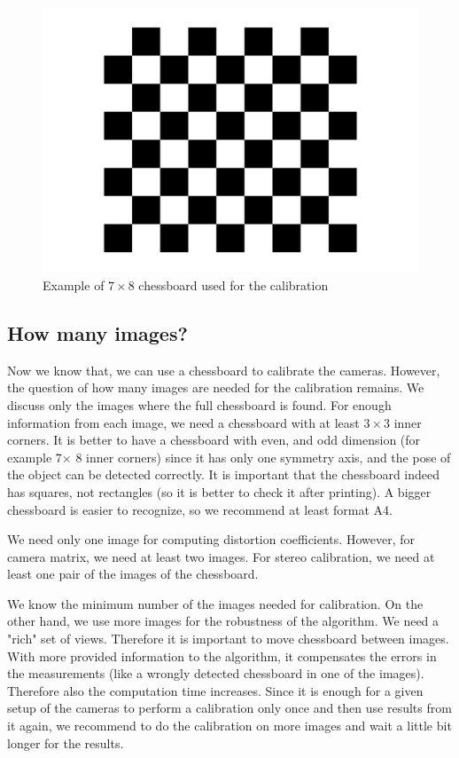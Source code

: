 \begin{figure}
	\centering
	\includegraphics[width=0.8\linewidth]{img/chessboard/7x8chessboard}
	\caption{Example of $7\times8$ chessboard used for the calibration}
	\label{fig:chessboard}
\end{figure}

\subsection{How many images?} 

Now we know that, we can use a chessboard to calibrate
the cameras. However, the question of how many images are needed for the
calibration remains. We discuss only the images where the full chessboard is
found. For enough information from each image, we need a chessboard with at
least $3\times3$ inner corners. It is better to have a chessboard with even,
and odd dimension (for example 7$\times$ 8 inner corners) since it has only one
symmetry axis, and the pose of the object can be detected correctly. It is
important that the chessboard indeed has squares, not rectangles (so it is better
to check it after printing). A bigger chessboard is easier to recognize, so we
recommend at least format A4.

We need only one image for computing distortion coefficients. However, for
camera matrix, we need at least two images. For stereo calibration, we need at
least one pair of the images of the chessboard.

We know the minimum number of the images needed for calibration. On the other
hand, we use more images for the robustness of the algorithm. We need a "rich"
set of views. Therefore it is important to move chessboard between images. With
more provided information to the algorithm, it compensates the errors in the
measurements (like a wrongly detected chessboard in one of the images).
Therefore also the computation time increases. Since it is enough for a given
setup of the cameras to perform a calibration only once and then use results
from it again, we recommend to do the calibration on more images and wait a
little bit longer for the results. 


